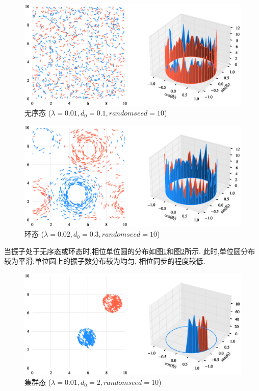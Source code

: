 \documentclass{article}
\begin{document}
\begin{figure}[H]
	\centering
	\includegraphics[width=\textwidth]{./figs/CorrectCoupling_uniform_0.010_0.10.eps}
	\vspace{-1cm}
	\caption{无序态 ($\lambda=0.01, d_0=0.1, random seed=10$)}
	\label{fig:fig231.1}
\end{figure}

\begin{figure}[H]
	\centering
	\includegraphics[width=\textwidth]{./figs/CorrectCoupling_uniform_0.020_0.30.eps}
	\vspace{-1cm}
	\caption{环态 ($\lambda=0.02, d_0=0.3, random seed=10$)}
	\label{fig:fig231.2}
\end{figure}

当振子处于无序态或环态时,相位单位圆的分布如图\ref{fig:fig231.1}和图\ref{fig:fig231.2}所示. 此时,单位圆分布较为平滑,单位圆上的振子数分布较为均匀, 相位同步的程度较低.

\begin{figure}[H]
	\centering
	\includegraphics[width=\textwidth]{./figs/CorrectCoupling_uniform_0.010_2.00.eps}
	\vspace{-1cm}
	\caption{集群态 ($\lambda=0.01, d_0=2, random seed=10$)}
	\label{fig:fig231.3}
\end{figure}
\end{document}
